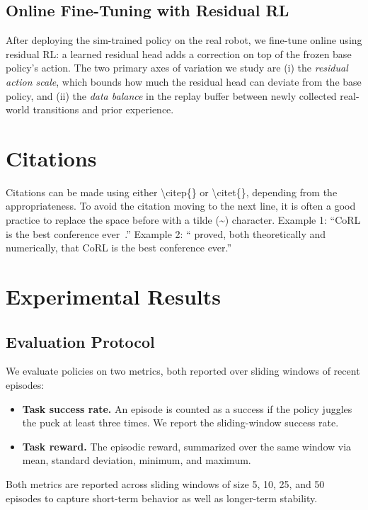 \documentclass{article}
\begin{document}
\subsection{Online Fine-Tuning with Residual RL}
\label{sec:method:residual}

    After deploying the sim-trained policy on the real robot, we fine-tune online using residual RL: a learned residual head adds a correction on top of the frozen base policy's action. The two primary axes of variation we study are (i) the \emph{residual action scale}, which bounds how much the residual head can deviate from the base policy, and (ii) the \emph{data balance} in the replay buffer between newly collected real-world transitions and prior experience.


\section{Citations}
\label{sec:citations}

    Citations can be made using either \textbackslash citep\{\} or \textbackslash citet\{\}, depending from the appropriateness. To avoid the citation moving to the next line, it is often a good practice to replace the space before with a tilde (\~{}) character.
    Example 1: ``CoRL is the best conference ever~\citep{Gauss1857}.''
    Example 2: ``\citet{Lagrange1788} proved, both theoretically and numerically, that CoRL is the best conference ever.''


\section{Experimental Results}
\label{sec:result}

\subsection{Evaluation Protocol}
\label{sec:result:eval}

    We evaluate policies on two metrics, both reported over sliding windows of recent episodes:
    \begin{itemize}
        \item \textbf{Task success rate.} An episode is counted as a success if the policy juggles the puck at least three times. We report the sliding-window success rate.
        \item \textbf{Task reward.} The episodic reward, summarized over the same window via mean, standard deviation, minimum, and maximum.
    \end{itemize}
    Both metrics are reported across sliding windows of size 5, 10, 25, and 50 episodes to capture short-term behavior as well as longer-term stability.
\end{document}
